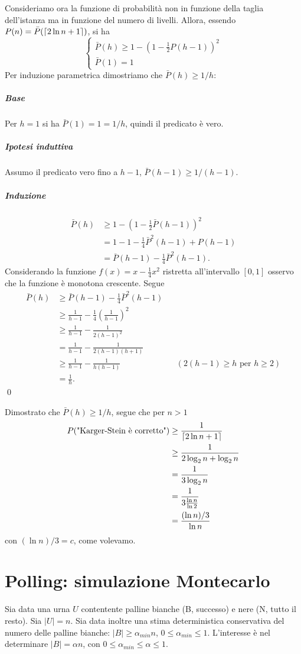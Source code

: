 Consideriamo ora la funzione di probabilità non in funzione della taglia dell'istanza ma in funzione del numero di livelli. Allora, essendo $P(n)=\bar{P}(\lceil2\ln n+1\rceil)$, si ha
\[
\begin{cases}
\bar{P}(h)\geq 1-\left(1-\frac{1}{2}P(h-1)\right)^2 \\
\bar{P}(1)=1
\end{cases}
\]
Per induzione parametrica dimostriamo che $\bar{P}(h)\geq 1/h$:
\subparagraph*{Base}
Per $h=1$ si ha $\bar{P}(1)=1=1/h$, quindi il predicato è vero.
\subparagraph*{Ipotesi induttiva}
Assumo il predicato vero fino a $h-1$, $\bar{P}(h-1)\geq 1/(h-1)$.
\subparagraph*{Induzione}
\begin{align*}
\bar{P}(h)&\geq 1-\left(1-\frac{1}{2}\bar{P}(h-1)\right)^2 \\
&=1-1-\frac{1}{4}\bar{P}^2(h-1)+P(h-1) \\
&=\bar{P}(h-1)-\frac{1}{4}\bar{P}^2(h-1).
\end{align*}
Considerando la funzione $f(x)=x-\frac{1}{4}x^2$ ristretta all'intervallo $[0,1]$ osservo che la funzione è monotona crescente. Segue
\begin{align*}
\bar{P}(h)&\geq\bar{P}(h-1)-\frac{1}{4}\bar{P}^2(h-1) \\
&\geq \frac{1}{h-1}-\frac{1}{4}\left(\frac{1}{h-1}\right)^2 \\
&\geq \frac{1}{h-1}-\frac{1}{2(h-1)^2} \\
&=\frac{1}{h-1}-\frac{1}{2(h-1)(h+1)} \\
&\geq \frac{1}{h-1}-\frac{1}{h(h-1)} && (2(h-1)\geq h \text{ per } h\geq 2) \\
&=\frac{1}{h}.
\end{align*}
\qed

Dimostrato che $\bar{P}(h)\geq 1/h$, segue che per $n>1$
\begin{align*}
P(\text{"Karger-Stein è corretto"})&\geq \frac{1}{\lceil2\ln n+1\rceil} \\
&\geq \frac{1}{2\log_2 n+\log_2 n} \\
&=\frac{1}{3\log_2 n} \\
&=\frac{1}{3\frac{\ln n}{\ln 2}} \\
&=\frac{(\ln n)/3}{\ln n}
\end{align*}
con $(\ln n)/3=c$, come volevamo.

\section{Polling: simulazione Montecarlo}
Sia data una urna $U$ contentente palline bianche (B, successo) e nere (N, tutto il resto). Sia $|U|=n$. Sia data inoltre una stima deterministica conservativa del numero delle palline bianche: $|B|\geq \alpha_{min}n$, $0\leq\alpha_{min}\leq 1$. L'interesse è nel determinare $|B|=\alpha n$, con $0\leq\alpha_{min}\leq\alpha\leq 1$.

